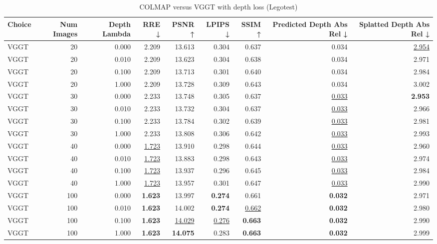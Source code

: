 \begin{table}[H]
\caption{COLMAP versus VGGT with depth loss (Legotest)}
\label{tab:05_depth_lambda_num_images_legotest}
\begin{tabular}{lrrrrrrrr}
\toprule
Choice & Num Images & Depth Lambda & RRE ↓ & PSNR ↑ & LPIPS ↓ & SSIM ↑ & Predicted Depth Abs Rel ↓ & Splatted Depth Abs Rel ↓ \\
\midrule
VGGT & 20 & 0.000 & 2.209 & 13.613 & 0.304 & 0.637 & 0.034 & \underline{2.954} \\
VGGT & 20 & 0.010 & 2.209 & 13.623 & 0.304 & 0.638 & 0.034 & 2.971 \\
VGGT & 20 & 0.100 & 2.209 & 13.713 & 0.301 & 0.640 & 0.034 & 2.984 \\
VGGT & 20 & 1.000 & 2.209 & 13.728 & 0.309 & 0.643 & 0.034 & 3.002 \\
VGGT & 30 & 0.000 & 2.233 & 13.748 & 0.305 & 0.637 & \underline{0.033} & \textbf{2.953} \\
VGGT & 30 & 0.010 & 2.233 & 13.732 & 0.304 & 0.637 & \underline{0.033} & 2.966 \\
VGGT & 30 & 0.100 & 2.233 & 13.784 & 0.302 & 0.639 & \underline{0.033} & 2.981 \\
VGGT & 30 & 1.000 & 2.233 & 13.808 & 0.306 & 0.642 & \underline{0.033} & 2.993 \\
VGGT & 40 & 0.000 & \underline{1.723} & 13.910 & 0.298 & 0.644 & \underline{0.033} & 2.960 \\
VGGT & 40 & 0.010 & \underline{1.723} & 13.883 & 0.298 & 0.643 & \underline{0.033} & 2.974 \\
VGGT & 40 & 0.100 & \underline{1.723} & 13.937 & 0.296 & 0.645 & \underline{0.033} & 2.984 \\
VGGT & 40 & 1.000 & \underline{1.723} & 13.957 & 0.301 & 0.647 & \underline{0.033} & 2.990 \\
VGGT & 100 & 0.000 & \textbf{1.623} & 13.997 & \textbf{0.274} & 0.661 & \textbf{0.032} & 2.971 \\
VGGT & 100 & 0.010 & \textbf{1.623} & 14.002 & \textbf{0.274} & \underline{0.662} & \textbf{0.032} & 2.980 \\
VGGT & 100 & 0.100 & \textbf{1.623} & \underline{14.029} & \underline{0.276} & \textbf{0.663} & \textbf{0.032} & 2.990 \\
VGGT & 100 & 1.000 & \textbf{1.623} & \textbf{14.075} & 0.283 & \textbf{0.663} & \textbf{0.032} & 2.999 \\
\bottomrule
\end{tabular}
\end{table}
